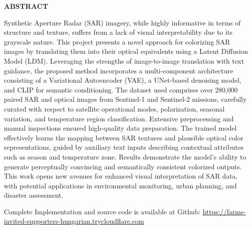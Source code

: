 \begin{center}
    {\large {\bf ABSTRACT}}
\end{center}

Synthetic Aperture Radar (SAR) imagery, while highly informative in terms of structure and texture, suffers from a lack of visual interpretability due to its grayscale nature. This project presents a novel approach for colorizing SAR images by translating them into their optical equivalents using a Latent Diffusion Model (LDM). Leveraging the strengths of image-to-image translation with text guidance, the proposed method incorporates a multi-component architecture consisting of a Variational Autoencoder (VAE), a UNet-based denoising model, and CLIP for semantic conditioning. The dataset used comprises over 280,000 paired SAR and optical images from Sentinel-1 and Sentinel-2 missions, carefully curated with respect to satellite operational modes, polarization, seasonal variation, and temperature region classification. Extensive preprocessing and manual inspections ensured high-quality data preparation. The trained model effectively learns the mapping between SAR textures and plausible optical color representations, guided by auxiliary text inputs describing contextual attributes such as season and temperature zone. Results demonstrate the model’s ability to generate perceptually convincing and semantically consistent colorized outputs. This work opens new avenues for enhanced visual interpretation of SAR data, with potential applications in environmental monitoring, urban planning, and disaster assessment.

Complete Implementation and source code is available at Github: \url{https://farms-invited-supporters-hungarian.trycloudflare.com}